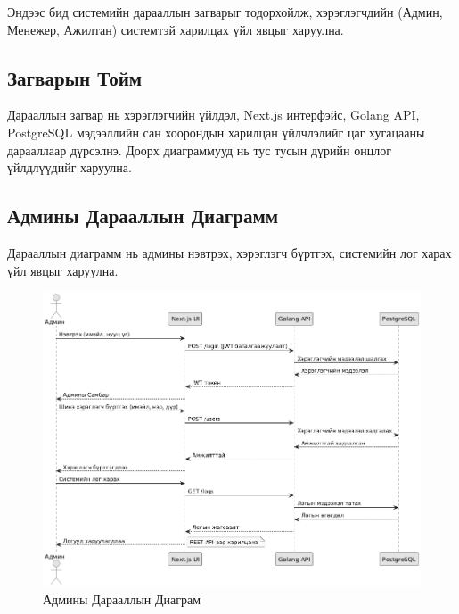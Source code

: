 
Эндээс бид системийн дарааллын загварыг тодорхойлж, хэрэглэгчдийн (Админ, Менежер, Ажилтан) системтэй харилцах үйл явцыг харуулна.

\subsection*{Загварын Тойм}
Дарааллын загвар нь хэрэглэгчийн үйлдэл, Next.js интерфэйс, Golang API, PostgreSQL мэдээллийн сан хоорондын харилцан үйлчлэлийг цаг хугацааны дарааллаар дүрсэлнэ. Доорх диаграммууд нь тус тусын дүрийн онцлог үйлдлүүдийг харуулна.

\subsection*{Админы Дарааллын Диаграмм}
Дарааллын диаграмм нь админы нэвтрэх, хэрэглэгч бүртгэх, системийн лог харах үйл явцыг харуулна.
\begin{figure}[H]
    \centering
    \includegraphics[width=\textwidth]{src/images/admin-seq.png}
    \caption{Админы Дарааллын Диаграм}
    \label{fig:admin_sequence_diagram}
\end{figure}

